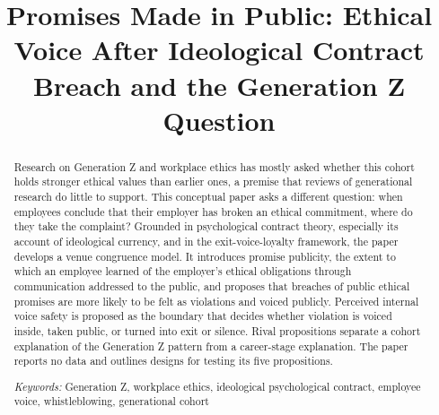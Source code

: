 \documentclass[12pt,a4paper]{article}
\title{Promises Made in Public: Ethical Voice After Ideological Contract Breach and the Generation Z Question}
\author{}
\date{}
\theoremstyle{definition}
\begin{document}
\maketitle
\vspace{-2em}

\begin{abstract}
\noindent Research on Generation Z and workplace ethics has mostly asked whether this cohort holds stronger ethical values than earlier ones, a premise that reviews of generational research do little to support. This conceptual paper asks a different question: when employees conclude that their employer has broken an ethical commitment, where do they take the complaint? Grounded in psychological contract theory, especially its account of ideological currency, and in the exit-voice-loyalty framework, the paper develops a venue congruence model. It introduces promise publicity, the extent to which an employee learned of the employer's ethical obligations through communication addressed to the public, and proposes that breaches of public ethical promises are more likely to be felt as violations and voiced publicly. Perceived internal voice safety is proposed as the boundary that decides whether violation is voiced inside, taken public, or turned into exit or silence. Rival propositions separate a cohort explanation of the Generation Z pattern from a career-stage explanation. The paper reports no data and outlines designs for testing its five propositions.

\medskip
\noindent\textit{Keywords:} Generation Z, workplace ethics, ideological psychological contract, employee voice, whistleblowing, generational cohort
\end{abstract}










\end{document}
